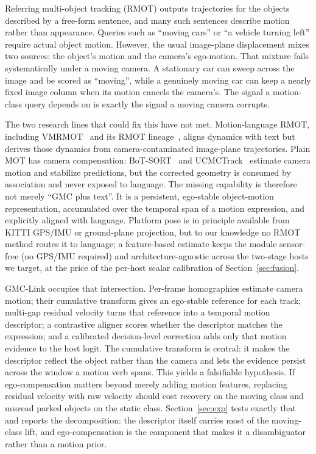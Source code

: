 \documentclass[sigconf,anonymous,nonacm]{acmart}
\begin{document}
Referring multi-object tracking (RMOT) outputs trajectories for the objects described by a free-form sentence, and many such sentences describe motion rather than appearance. Queries such as ``moving cars'' or ``a vehicle turning left'' require actual object motion. However, the usual image-plane displacement mixes two sources: the object's motion and the camera's ego-motion. That mixture fails systematically under a moving camera. A stationary car can sweep across the image and be scored as ``moving'', while a genuinely moving car can keep a nearly fixed image column when its motion cancels the camera's. The signal a motion-class query depends on is exactly the signal a moving camera corrupts.

The two research lines that could fix this have not met. Motion-language RMOT, including VMRMOT~\cite{vmrmot} and its RMOT lineage~\cite{transrmot,ikun,flexhook}, aligns dynamics with text but derives those dynamics from camera-contaminated image-plane trajectories. Plain MOT has camera compensation: BoT-SORT~\cite{botsort} and UCMCTrack~\cite{ucmctrack} estimate camera motion and stabilize predictions, but the corrected geometry is consumed by association and never exposed to language. The missing capability is therefore not merely ``GMC plus text''. It is a persistent, ego-stable object-motion representation, accumulated over the temporal span of a motion expression, and explicitly aligned with language. Platform pose is in principle available from KITTI GPS/IMU or ground-plane projection, but to our knowledge no RMOT method routes it to language; a feature-based estimate keeps the module sensor-free (no GPS/IMU required) and architecture-agnostic across the two-stage hosts we target, at the price of the per-host scalar calibration of Section~\ref{sec:fusion}.

GMC-Link occupies that intersection. Per-frame homographies estimate camera motion; their cumulative transform gives an ego-stable reference for each track; multi-gap residual velocity turns that reference into a temporal motion descriptor; a contrastive aligner scores whether the descriptor matches the expression; and a calibrated decision-level correction adds only that motion evidence to the host logit. The cumulative transform is central: it makes the descriptor reflect the object rather than the camera and lets the evidence persist across the window a motion verb spans. This yields a falsifiable hypothesis. If ego-compensation matters beyond merely adding motion features, replacing residual velocity with raw velocity should cost recovery on the moving class and misread parked objects on the static class. Section~\ref{sec:exp} tests exactly that and reports the decomposition: the descriptor itself carries most of the moving-class lift, and ego-compensation is the component that makes it a disambiguator rather than a motion prior.
\end{document}
